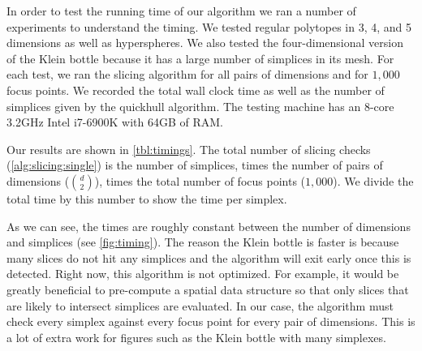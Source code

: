 In order to test the running time of our algorithm we ran a number of
experiments to understand the timing. We tested regular polytopes in 3, 4, and
5 dimensions as well as hyperspheres. We also tested the four-dimensional
version of the Klein bottle because it has a large number of simplices in its
mesh. For each test, we ran the slicing algorithm for all pairs of dimensions
and for $1,000$ focus points. We recorded the total wall clock time as well as
the number of simplices given by the quickhull algorithm. The testing machine
has an 8-core 3.2GHz Intel i7-6900K with 64GB of RAM.

Our results are shown in \autoref{tbl:timings}. The total number of slicing
checks (\autoref{alg:slicing:single}) is the number of simplices, times the
number of pairs of dimensions ($d \choose 2$), times the total number of focus
points ($1,000$). We divide the total time by this number to show the time per
simplex. 

As we can see, the times are roughly constant between the number of
dimensions and simplices (see \autoref{fig:timing}). The reason the Klein 
bottle is faster is because
many slices do not hit any simplices and the algorithm will exit early
once this is detected. Right now, this algorithm is not optimized.
For example, it would be greatly beneficial to pre-compute a spatial data
structure so that only slices that are likely to intersect simplices are
evaluated. In our case, the algorithm must check every simplex against every
focus point for every pair of dimensions. This is a lot of extra work for figures
such as the Klein bottle with many simplexes.


